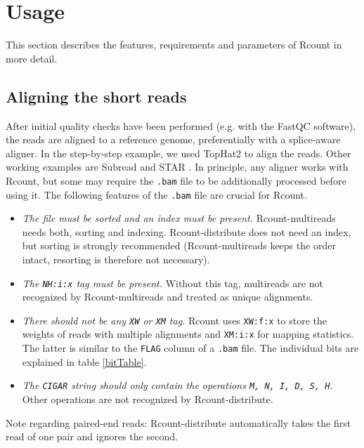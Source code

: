 \documentclass[a4paper,10pt]{article}
\begin{document}
\section{Usage}
This section describes the features, requirements and parameters of Rcount in more detail. 
\subsection{Aligning the short reads}
After initial quality checks have been performed (e.g. with the FastQC software), the reads are aligned to a reference genome, preferentially with a splice-aware aligner. In the step-by-step example, we used TopHat2 \cite{2013_Kim} to align the reads. Other working examples are Subread \cite{2013_Liao} and STAR \cite{2013_Dobin}. In principle, any aligner works with Rcount, but some may require the \texttt{.bam} file to be additionally processed before using it. The following features of the \texttt{.bam} file are crucial for Rcount. 
\begin{itemize}
 \item \textit{The file must be sorted and an index must be present.}\newline
Rcount-multireads needs both, sorting and indexing. Rcount-distribute does not need an index, but sorting is strongly recommended (Rcount-multireads keeps the order intact, resorting is therefore not necessary).
 \item \textit{The \texttt{NH:i:x} tag must be present.}\newline
Without this tag, multireads are not recognized by Rcount-multireads and treated as unique alignments.
 \item \textit{There should not be any \texttt{XW} or \texttt{XM} tag. }\newline
Rcount uses \texttt{XW:f:x} to store the weights of reads with multiple alignments and \texttt{XM:i:x} for mapping statistics. The latter is similar to the \texttt{FLAG} column of a \texttt{.bam} file. The individual bits are explained in table \ref{bitTable}.
 \item \textit{The \texttt{CIGAR} string should only contain the operations \texttt{M, N, I, D, S, H}.}\newline
Other operations are not recognized by Rcount-distribute.
\end{itemize}
Note regarding paired-end reads: Rcount-distribute automatically takes the first read of one pair and ignores the second. 
\end{document}
